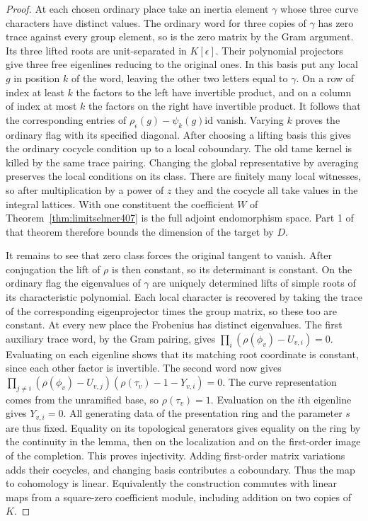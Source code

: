 \documentclass[a4paper,11pt]{article}
\theoremstyle{definition}
\theoremstyle{remark}
\numberwithin{equation}{section}
\begin{document}
\begin{proof}
At each chosen ordinary place take an inertia element
\(\gamma\) whose three curve characters have distinct
values. The ordinary word for three copies of \(\gamma\)
has zero trace against every group element, so is the zero
matrix by the Gram argument. Its three lifted roots are
unit-separated in \(K[\epsilon]\). Their polynomial
projectors give three free eigenlines reducing to the
original ones. In this basis put any local \(g\) in position
\(k\) of the word, leaving the other two letters equal to
\(\gamma\). On a row of index at least \(k\) the factors
to the left have invertible product, and on a column of
index at most \(k\) the factors on the right have invertible
product. It follows that the corresponding entries of
\(\rho_\epsilon(g)-\psi_k(g)\mathrm{id}\) vanish. Varying
\(k\) proves the ordinary flag with its specified diagonal.
After choosing a lifting basis this gives the ordinary
cocycle condition up to a local coboundary. The old tame
kernel is killed by the same trace pairing. Changing the
global representative by averaging preserves the local
conditions on its class. There are finitely many local
witnesses, so after multiplication by a power of \(z\)
they and the cocycle all take values in the integral
lattices. With one constituent the coefficient \(W\) of
Theorem~\ref{thm:limitselmer407} is the full adjoint
endomorphism space. Part 1 of that theorem therefore
bounds the dimension of the target by \(D\).

It remains to see that zero class forces the original
tangent to vanish. After conjugation the lift of \(\rho\)
is then constant, so its determinant is constant. On the
ordinary flag the eigenvalues of \(\gamma\) are uniquely
determined lifts of simple roots of its characteristic
polynomial. Each local character is recovered by taking
the trace of the corresponding eigenprojector times the
group matrix, so these too are constant. At every new
place the Frobenius has distinct eigenvalues. The first
auxiliary trace word, by the Gram pairing, gives
\(\prod_i(\rho(\phi_v)-U_{v,i})=0\). Evaluating on each
eigenline shows that its matching root coordinate is
constant, since each other factor is invertible. The
second word now gives
\(\prod_{j\ne i}(\rho(\phi_v)-U_{v,j})
(\rho(\tau_v)-1-Y_{v,i})=0\). The curve representation
comes from the unramified base, so \(\rho(\tau_v)=1\).
Evaluation on the \(i\)th eigenline gives \(Y_{v,i}=0\).
All generating data of the presentation ring and the
parameter \(s\) are thus fixed. Equality on its topological
generators gives equality on the ring by the continuity
in the lemma, then on the localization and on the
first-order image of the completion. This proves injectivity.
Adding first-order matrix variations adds their cocycles,
and changing basis contributes a coboundary. Thus the map
to cohomology is linear. Equivalently the construction commutes with
linear maps from a square-zero coefficient module, including
addition on two copies of \(K\).
\end{proof}
\end{document}
